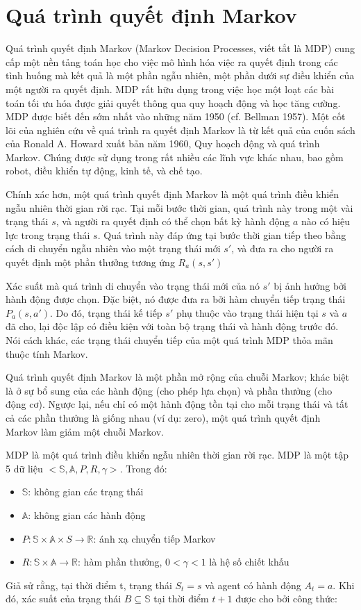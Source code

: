 \documentclass[14pt]{extreport}
\begin{document}
 
\section{Quá trình quyết định Markov}

 Quá trình quyết định Markov (Markov Decision Processes, viết tắt là MDP) cung cấp một nền tảng toán học cho việc mô hình hóa việc ra quyết định trong các tình huống mà kết quả là một phần ngẫu nhiên, một phần dưới sự điều khiển của một người ra quyết định. MDP rất hữu dụng trong việc học một loạt các bài toán tối ưu hóa được giải quyết thông qua quy hoạch động và học tăng cường. MDP được biết đến sớm nhất vào những năm 1950 (cf. Bellman 1957).  Một cốt lõi của nghiên cứu về quá trình ra quyết định Markov là từ kết quả của cuốn sách của Ronald A. Howard xuất bản năm 1960, Quy hoạch động và quá trình Markov. Chúng được sử dụng trong rất nhiều các lĩnh vực khác nhau, bao gồm robot, điều khiển tự động, kinh tế, và chế tạo.
 
 Chính xác hơn, một quá trình quyết định Markov là một quá trình điều khiển ngẫu nhiên thời gian rời rạc. Tại mỗi bước thời gian, quá trình này trong một vài trạng thái $s$, và người ra quyết định có thể chọn bất kỳ hành động $a$ nào có hiệu lực trong trạng thái $s$. Quá trình này đáp ứng tại bước thời gian tiếp theo bằng cách di chuyển ngẫu nhiên vào một trạng thái mới $s'$, và đưa ra cho người ra quyết định một phần thưởng tương ứng $R_a (s,s')$
 
 Xác suất mà quá trình di chuyển vào trạng thái mới của nó $s'$ bị ảnh hưởng bởi hành động được chọn. Đặc biệt, nó được đưa ra bởi hàm chuyển tiếp trạng thái $P_a (s,a')$. Do đó, trạng thái kế tiếp $s'$ phụ thuộc vào trạng thái hiện tại $s$ và $a$ đã cho, lại độc lập có điều kiện với toàn bộ trạng thái và hành động trước đó. Nói cách khác, các trạng thái chuyển tiếp của một quá trình MDP thỏa mãn thuộc tính Markov.
 
 Quá trình quyết định Markov là một phần mở rộng của chuỗi Markov; khác biệt là ở sự bổ sung của các hành động (cho phép lựa chọn) và phần thưởng (cho động cơ). Ngược lại, nếu chỉ có một hành động tồn tại cho mỗi trạng thái và tất cả các phần thưởng là giống nhau (ví dụ: zero), một quá trình quyết định Markov làm giảm một chuỗi Markov.

MDP là một quá trình điều khiển ngẫu nhiên thời gian rời rạc. MDP là một tập 5 dữ liệu $<\mathbb{S},\mathbb{A},P,R,\gamma>$. Trong đó:

\begin{itemize}
 \item  $\mathbb{S}$: không gian các trạng thái
 \item $\mathbb{A}$: không gian các hành động
 \item  $P: \mathbb{S} \times\mathbb{A} \times S\rightarrow \mathbb{R}$: ánh xạ chuyển tiếp Markov
 \item $R: \mathbb{S} \times \mathbb{A}\rightarrow \mathbb{R}$: hàm phần thưởng, $0<\gamma<1$ là hệ số chiết khấu
\end{itemize}
 Giả sử rằng, tại thời điểm t, trạng thái $S_t=s$ và agent có hành động $A_t=a$. Khi đó, xác suất của trạng thái $B \subseteq \mathbb{S}$ tại thời điểm $t+1$ được cho bởi công thức:
 
\end{document}
